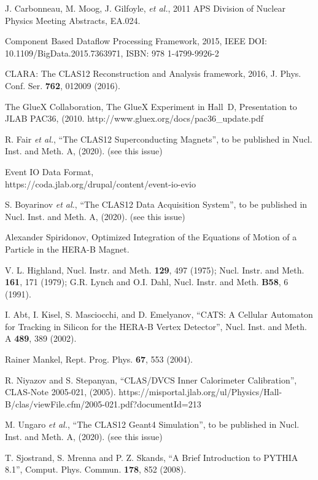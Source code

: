 \documentclass[3p,times,twocolumn]{elsarticle}
\begin{document}
\begin{thebibliography}{99}
J. Carbonneau, M. Moog,  J. Gilfoyle, {\it et al.}, 2011 APS Division of Nuclear Physics Meeting Abstracts, EA.024.

Component Based Dataflow Processing Framework, 2015, IEEE DOI: 10.1109/BigData.2015.7363971,
ISBN: 978 1-4799-9926-2

CLARA: The CLAS12 Reconstruction and Analysis framework, 2016, J. Phys. Conf. Ser. {\bf 762}, 012009 (2016).

The GlueX Collaboration, The GlueX Experiment in Hall~D, Presentation to JLAB PAC36, (2010.
http://www.gluex.org/docs/pac36\_update.pdf

R. Fair {\it et al.}, ``The CLAS12 Superconducting Magnets'', to be published in Nucl. Inst.
and Meth. A, (2020). (see this issue)

Event IO Data Format, \\ https://coda.jlab.org/drupal/content/event-io-evio

S. Boyarinov {\it et al.}, ``The CLAS12 Data Acquisition System'', to be published in Nucl. Inst. and
Meth. A, (2020). (see this issue)

Alexander Spiridonov, Optimized Integration of the Equations of Motion of a Particle in the HERA-B Magnet.

V. L. Highland, Nucl. Instr. and Meth. {\bf 129}, 497 (1975); Nucl. Instr. and Meth. {\bf 161}, 171 (1979);
G.R. Lynch and O.I. Dahl, Nucl. Instr. and Meth. {\bf B58}, 6 (1991).

I. Abt, I. Kisel, S. Masciocchi, and D. Emelyanov, ``CATS: A Cellular Automaton for Tracking in Silicon for the
HERA-B Vertex Detector'', Nucl. Inst. and Meth. A {\bf 489}, 389 (2002).

Rainer Mankel, Rept. Prog. Phys. {\bf 67}, 553 (2004).

R. Niyazov and S. Stepanyan, ``CLAS/DVCS Inner Calorimeter Calibration'', CLAS-Note 2005-021, (2005).
https://misportal.jlab.org/ul/Physics/Hall-B/clas/viewFile.cfm/2005-021.pdf?documentId=213

M. Ungaro {\it et al.},  ``The CLAS12 Geant4 Simulation'', to be published in Nucl. Inst. and Meth. A, (2020).
(see this issue)

T. Sjostrand, S. Mrenna and P. Z. Skands, ``A Brief Introduction to PYTHIA 8.1'', Comput. Phys. Commun. {\bf 178},
852 (2008).


\end{thebibliography}
\end{document}
